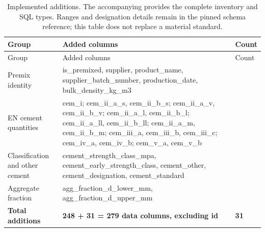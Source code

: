 \documentclass[
  american,
  11pt,
  letterpaper,
]{article}
\renewcommand{\texttt}[1]{{\ttfamily\fontsize{9.5}{11}\selectfont\hyphenchar\font=-1 #1}}
\begin{document}
\begin{longtable}[]{@{}
  >{\raggedright\arraybackslash}p{}
  >{\raggedright\arraybackslash}p{}
  >{\raggedleft\arraybackslash}p{}@{}}
\caption{Implemented additions. The accompanying
\protect\texttt{schema\_columns.csv} provides the complete inventory and
SQL types. Ranges and designation details remain in the pinned schema
reference; this table does not replace a material
standard.}\tabularnewline
\toprule\noalign{}
\begin{minipage}[b]{\linewidth}\raggedright
Group
\end{minipage} & \begin{minipage}[b]{\linewidth}\raggedright
Added columns
\end{minipage} & \begin{minipage}[b]{\linewidth}\raggedleft
Count
\end{minipage} \\
\midrule\noalign{}
\endfirsthead
\toprule\noalign{}
\begin{minipage}[b]{\linewidth}\raggedright
Group
\end{minipage} & \begin{minipage}[b]{\linewidth}\raggedright
Added columns
\end{minipage} & \begin{minipage}[b]{\linewidth}\raggedleft
Count
\end{minipage} \\
\midrule\noalign{}
\endhead
\bottomrule\noalign{}
\endlastfoot
Premix identity & \texttt{is\_premixed}, \texttt{supplier},
\texttt{product\_name}, \texttt{supplier\_batch\_number},
\texttt{production\_date}, \texttt{bulk\_density\_kg\_m3} & 6 \\
EN cement quantities & \texttt{cem\_i}; \texttt{cem\_ii\_a\_s},
\texttt{cem\_ii\_b\_s}; \texttt{cem\_ii\_a\_v}, \texttt{cem\_ii\_b\_v};
\texttt{cem\_ii\_a\_l}, \texttt{cem\_ii\_b\_l}; \texttt{cem\_ii\_a\_ll},
\texttt{cem\_ii\_b\_ll}; \texttt{cem\_ii\_a\_m}, \texttt{cem\_ii\_b\_m};
\texttt{cem\_iii\_a}, \texttt{cem\_iii\_b}, \texttt{cem\_iii\_c};
\texttt{cem\_iv\_a}, \texttt{cem\_iv\_b}; \texttt{cem\_v\_a},
\texttt{cem\_v\_b} & 18 \\
Classification and other cement & \texttt{cement\_strength\_class\_mpa},
\texttt{cement\_early\_strength\_class}, \texttt{cement\_other},
\texttt{cement\_designation}, \texttt{cement\_standard} & 5 \\
Aggregate fraction & \texttt{agg\_fraction\_d\_lower\_mm},
\texttt{agg\_fraction\_d\_upper\_mm} & 2 \\
\textbf{Total additions} & \textbf{248 + 31 = 279 data columns,
excluding \texttt{id}} & \textbf{31} \\
\end{longtable}
\end{document}
